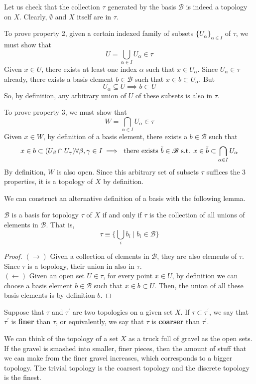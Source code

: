 \documentclass{article}
\begin{document}
    Let us check that the collection $\tau$ generated by the basis $\mathscr{B}$ is indeed a topology on $X$. Clearly, $\emptyset$ and $X$ itself are in $\tau$. 

    To prove property 2, given a certain indexed family of subsets $\{U_\alpha\}_{\alpha \in I}$ of $\tau$, we must show that 
    \[U = \bigcup_{\alpha \in I} U_\alpha \in \tau\]
    Given $x \in U$, there exists at least one index $\alpha$ such that $x \in U_\alpha$. Since $U_\alpha \in \tau$ already, there exists a basis element $b \in \mathscr{B}$ such that $x \in b \subset U_\alpha$. But 
    \[U_\alpha \subseteq U \implies b \subset U\]
    So, by definition, any arbitrary union of $U$ of these subsets is also in $\tau$. 

    To prove property 3, we must show that 
    \[W = \bigcap_{\alpha \in I} U_\alpha \in \tau\]
    Given $x \in W$, by definition of a basis element, there exists a $b \in \mathscr{B}$ such that 
    \[x \in b \subset (U_\beta \cap U_\gamma) \forall \beta, \gamma \in I \implies \text{ there exists } \Tilde{b} \in \mathscr{B} \text{ s.t. } x \in \Tilde{b} \subset \bigcap_{\alpha \in I} U_\alpha\]
    By definition, $W$ is also open. Since this arbitrary set of subsets $\tau$ suffices the 3 properties, it is a topology of $X$ by definition. 

    We can construct an alternative definition of a basis with the following lemma. 

    \begin{lemma}
    $\mathscr{B}$ is a basis for topology $\tau$ of $X$ if and only if $\tau$ is the collection of all unions of elements in $\mathscr{B}$. That is, 
    \[\tau \equiv \Big\{ \bigcup_i b_i \; \Big| \; b_i \in \mathscr{B}\Big\}\]
    \end{lemma}
    \begin{proof}
    $(\rightarrow)$ Given a collection of elements in $\mathscr{B}$, they are also elements of $\tau$. Since $\tau$ is a topology, their union in also in $\tau$. \\
    $(\leftarrow)$ Given an open set $U \in \tau$, for every point $x \in U$, by definition we can choose a basis element $b \in \mathscr{B}$ such that $x \in b \subset U$. Then, the union of all these basis elements is by definition $b$. 
    \end{proof}

    \begin{definition}
    Suppose that $\tau$ and $\tau^\prime$ are two topologies on a given set $X$. If $\tau \subset \tau^\prime$, we say that $\tau^\prime$ is \textbf{finer} than $\tau$, or equivalently, we say that $\tau$ is \textbf{coarser} than $\tau^\prime$. 
    \end{definition}
    We can think of the topology of a set $X$ as a truck full of gravel as the open sets. If the gravel is smashed into smaller, finer pieces, then the amount of stuff that we can make from the finer gravel increases, which corresponds to a bigger topology. The trivial topology is the coarsest topology and the discrete topology is the finest. 
\end{document}
